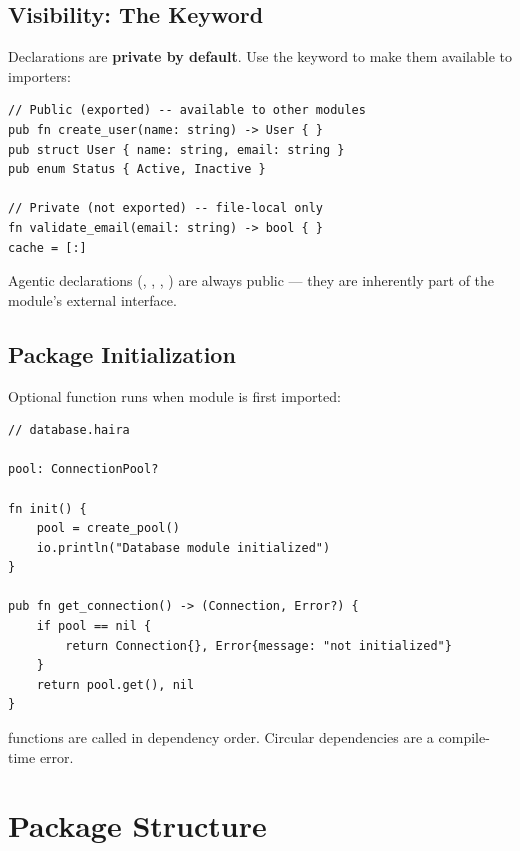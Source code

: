\subsection{Visibility: The  Keyword}

Declarations are \textbf{private by default}. Use the  keyword to make them available to importers:

\begin{lstlisting}
// Public (exported) -- available to other modules
pub fn create_user(name: string) -> User { }
pub struct User { name: string, email: string }
pub enum Status { Active, Inactive }

// Private (not exported) -- file-local only
fn validate_email(email: string) -> bool { }
cache = [:]
\end{lstlisting}

\begin{note}
Agentic declarations (, , , ) are always public --- they are inherently part of the module's external interface.
\end{note}

\subsection{Package Initialization}

Optional  function runs when module is first imported:

\begin{lstlisting}
// database.haira

pool: ConnectionPool?

fn init() {
    pool = create_pool()
    io.println("Database module initialized")
}

pub fn get_connection() -> (Connection, Error?) {
    if pool == nil {
        return Connection{}, Error{message: "not initialized"}
    }
    return pool.get(), nil
}
\end{lstlisting}

\begin{note}
 functions are called in dependency order. Circular dependencies are a compile-time error.
\end{note}

\section{Package Structure}

